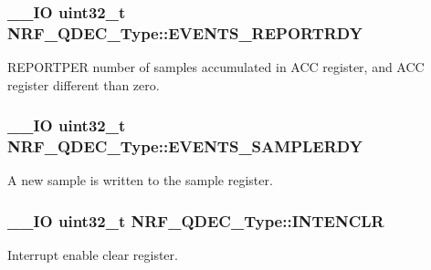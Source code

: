 \subsubsection[{E\+V\+E\+N\+T\+S\+\_\+\+R\+E\+P\+O\+R\+T\+R\+D\+Y}]{\setlength{\rightskip}{0pt plus 5cm}\+\_\+\+\_\+\+I\+O uint32\+\_\+t N\+R\+F\+\_\+\+Q\+D\+E\+C\+\_\+\+Type\+::\+E\+V\+E\+N\+T\+S\+\_\+\+R\+E\+P\+O\+R\+T\+R\+D\+Y}\label{struct_n_r_f___q_d_e_c___type_a652327f7f3e5d8fa43c3bbbe12e74465}
R\+E\+P\+O\+R\+T\+P\+E\+R number of samples accumulated in A\+C\+C register, and A\+C\+C register different than zero. \hypertarget{struct_n_r_f___q_d_e_c___type_a271e91771f17fb72f9b84bd09bfcd115}{}
\subsubsection[{E\+V\+E\+N\+T\+S\+\_\+\+S\+A\+M\+P\+L\+E\+R\+D\+Y}]{\setlength{\rightskip}{0pt plus 5cm}\+\_\+\+\_\+\+I\+O uint32\+\_\+t N\+R\+F\+\_\+\+Q\+D\+E\+C\+\_\+\+Type\+::\+E\+V\+E\+N\+T\+S\+\_\+\+S\+A\+M\+P\+L\+E\+R\+D\+Y}\label{struct_n_r_f___q_d_e_c___type_a271e91771f17fb72f9b84bd09bfcd115}
A new sample is written to the sample register. \hypertarget{struct_n_r_f___q_d_e_c___type_a461344b0ea84cbede379a441f5fef2c0}{}
\subsubsection[{I\+N\+T\+E\+N\+C\+L\+R}]{\setlength{\rightskip}{0pt plus 5cm}\+\_\+\+\_\+\+I\+O uint32\+\_\+t N\+R\+F\+\_\+\+Q\+D\+E\+C\+\_\+\+Type\+::\+I\+N\+T\+E\+N\+C\+L\+R}\label{struct_n_r_f___q_d_e_c___type_a461344b0ea84cbede379a441f5fef2c0}
Interrupt enable clear register. \hypertarget{struct_n_r_f___q_d_e_c___type_a147145269532ef25ff7c7ef4ad3dda64}{}

